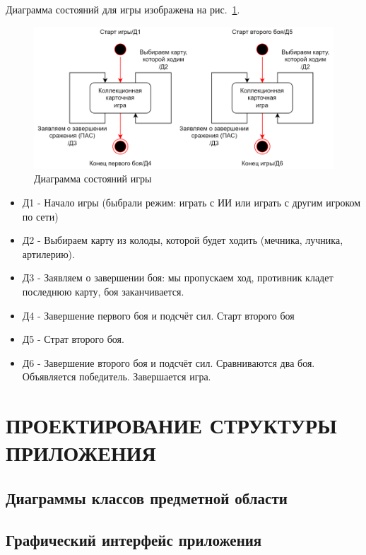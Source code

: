 \documentclass[12pt, a4paper, simple]{eskdtext}
\begin{document}
    Диаграмма состояний для игры изображена на рис.~\ref{fig:game__statechart_diagram}.

    \begin{figure}[!h]
        \centering
        \includegraphics[]
            {../sources/game_architecture/build/game__statechart_diagram.png}
        \caption{Диаграмма состояний игры}
        \label{fig:game__statechart_diagram}
    \end{figure}

    \begin{itemize}
        \item Д1 - Начало игры (быбрали режим: играть с ИИ или играть с другим игроком по сети)
        \item Д2 - Выбираем карту из колоды, которой будет ходить (мечника, лучника, артилерию).
        \item Д3 - Заявляем о завершении боя: мы пропускаем ход, противник кладет последнюю карту, боя заканчивается.
        \item Д4 - Завершение первого боя и подсчёт сил. Старт второго боя
        \item Д5 - Страт второго боя.
        \item Д6 - Завершение второго боя и подсчёт сил. Сравниваются два боя. Объявляется победитель. Завершается игра.
    \end{itemize}

    \newpage
    \section{ПРОЕКТИРОВАНИЕ СТРУКТУРЫ ПРИЛОЖЕНИЯ}
    \subsection{Диаграммы классов предметной области}
    \subsection{Графический интерфейс приложения}
    
\end{document}
